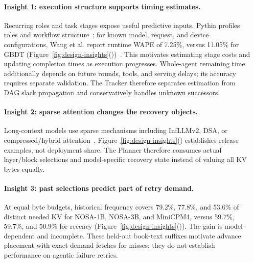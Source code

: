 \paragraph{Insight 1: execution structure supports timing estimates.}
Recurring roles and task stages expose useful predictive inputs.
Pythia profiles roles and workflow structure~\cite{yu2026pythia};
for known model, request, and device configurations, Wang et al.
report runtime WAPE of 7.25\%, versus 11.05\% for GBDT
(Figure~\ref{fig:design-insights}())~\cite{wang2026runtimecandidate}.
This motivates estimating stage costs and updating completion times as
execution progresses. Whole-agent remaining time additionally depends on
future rounds, tools, and serving delays; its accuracy requires separate
validation. The Tracker therefore separates estimation from DAG slack
propagation and conservatively handles unknown successors.

\paragraph{Insight 2: sparse attention changes the recovery objects.}
Long-context models use sparse mechanisms including InfLLMv2,
DSA, or compressed/hybrid attention~\cite{minicpm4model,
openbmb2025minicpm41,deepseek2025v32exp,deepseek2025v32model,
zai2026glm5model,openbmb2026sala,deepseek2026v4model,minimax2026m3,
zai2026glm52,longcat2026sparse}.
Figure~\ref{fig:design-insights}()
establishes release examples, not deployment share.
The Planner therefore consumes actual layer/block selections and
model-specific recovery state instead of valuing all KV bytes equally.

\paragraph{Insight 3: past selections predict part of retry demand.}
At equal byte budgets, historical frequency covers 79.2\%, 77.8\%, and
53.6\% of distinct needed KV for NOSA-1B, NOSA-3B, and MiniCPM4,
versus 59.7\%, 59.7\%, and 50.9\% for recency
(Figure~\ref{fig:design-insights}()). The gain is
model-dependent and incomplete. These held-out book-text suffixes
motivate advance placement with exact demand fetches for misses;
they do not establish performance on agentic failure retries.
